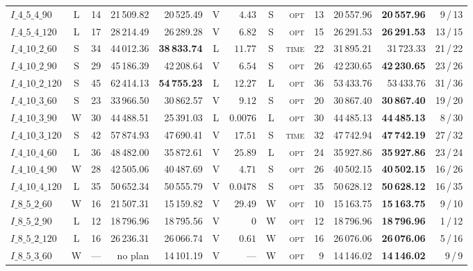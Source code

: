 \begin{table}[!htbp]
{\begin{tabular}{lcrrrcrcrrrrr}
$I\_4\_5\_4\_90$ & L & 14 & 21\,509.82 & 20\,525.49 & V & $4.43$ & S & \textsc{opt} & 13 & 20\,557.96 & \textbf{20\,557.96} & 9\,/\,13 \\
$I\_4\_5\_4\_120$ & L & 17 & 28\,214.49 & 26\,289.28 & V & $6.82$ & S & \textsc{opt} & 15 & 26\,291.53 & \textbf{26\,291.53} & 13\,/\,15 \\
$I\_4\_10\_2\_60$ & S & 34 & 44\,012.36 & \textbf{38\,833.74} & L & $11.77$ & S & \textsc{time} & 22 & 31\,895.21 & 31\,723.33 & 21\,/\,22 \\
$I\_4\_10\_2\_90$ & S & 29 & 45\,186.39 & 42\,208.64 & V & $6.54$ & S & \textsc{opt} & 26 & 42\,230.65 & \textbf{42\,230.65} & 23\,/\,26 \\
$I\_4\_10\_2\_120$ & S & 45 & 62\,414.13 & \textbf{54\,755.23} & L & $12.27$ & L & \textsc{opt} & 36 & 53\,433.76 & 53\,433.76 & 31\,/\,36 \\
$I\_4\_10\_3\_60$ & S & 23 & 33\,966.50 & 30\,862.57 & V & $9.12$ & S & \textsc{opt} & 20 & 30\,867.40 & \textbf{30\,867.40} & 19\,/\,20 \\
$I\_4\_10\_3\_90$ & W & 30 & 44\,488.51 & 25\,391.03 & L & $0.0076$ & L & \textsc{opt} & 30 & 44\,485.13 & \textbf{44\,485.13} & 8\,/\,30 \\
$I\_4\_10\_3\_120$ & S & 42 & 57\,874.93 & 47\,690.41 & V & $17.51$ & S & \textsc{time} & 32 & 47\,742.94 & \textbf{47\,742.19} & 27\,/\,32 \\
$I\_4\_10\_4\_60$ & L & 36 & 48\,482.00 & 35\,872.61 & V & $25.89$ & L & \textsc{opt} & 24 & 35\,927.86 & \textbf{35\,927.86} & 23\,/\,24 \\
$I\_4\_10\_4\_90$ & W & 28 & 42\,505.06 & 40\,487.69 & V & $4.71$ & S & \textsc{opt} & 26 & 40\,502.15 & \textbf{40\,502.15} & 16\,/\,26 \\
$I\_4\_10\_4\_120$ & L & 35 & 50\,652.34 & 50\,555.79 & V & $0.0478$ & S & \textsc{opt} & 35 & 50\,628.12 & \textbf{50\,628.12} & 16\,/\,35 \\
$I\_8\_5\_2\_60$ & W & 16 & 21\,507.31 & 15\,159.82 & V & $29.49$ & W & \textsc{opt} & 10 & 15\,163.75 & \textbf{15\,163.75} & 9\,/\,10 \\
$I\_8\_5\_2\_90$ & L & 12 & 18\,796.96 & 18\,795.56 & V & $0$ & W & \textsc{opt} & 12 & 18\,796.96 & \textbf{18\,796.96} & 1\,/\,12 \\
$I\_8\_5\_2\_120$ & L & 16 & 26\,236.31 & 26\,066.74 & V & $0.61$ & W & \textsc{opt} & 16 & 26\,076.06 & \textbf{26\,076.06} & 5\,/\,16 \\
$I\_8\_5\_3\_60$ & W & --- & no plan & 14\,101.19 & V & --- & W & \textsc{opt} & 9 & 14\,146.02 & \textbf{14\,146.02} & 9\,/\,9 \\

\end{tabular}}
\end{table}

